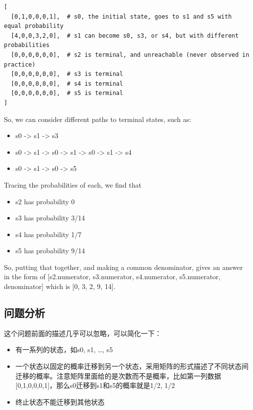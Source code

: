 \documentclass[12pt]{article}
\begin{document}
\begin{verbatim}
[
  [0,1,0,0,0,1],  # s0, the initial state, goes to s1 and s5 with equal probability
  [4,0,0,3,2,0],  # s1 can become s0, s3, or s4, but with different probabilities
  [0,0,0,0,0,0],  # s2 is terminal, and unreachable (never observed in practice)
  [0,0,0,0,0,0],  # s3 is terminal
  [0,0,0,0,0,0],  # s4 is terminal
  [0,0,0,0,0,0],  # s5 is terminal
]
\end{verbatim}

So, we can consider different paths to terminal states, such as:

\begin{itemize}
\tightlist
\item
  s0 -\textgreater{} s1 -\textgreater{} s3
\item
  s0 -\textgreater{} s1 -\textgreater{} s0 -\textgreater{} s1 -\textgreater{} s0 -\textgreater{} s1 -\textgreater{} s4
\item
  s0 -\textgreater{} s1 -\textgreater{} s0 -\textgreater{} s5
\end{itemize}

Tracing the probabilities of each, we find that

\begin{itemize}
\tightlist
\item
  s2 has probability 0
\item
  s3 has probability 3/14
\item
  s4 has probability 1/7
\item
  s5 has probability 9/14
\end{itemize}

So, putting that together, and making a common denominator, gives an answer in the form of {[}s2.numerator, s3.numerator, s4.numerator, s5.numerator, denominator{]} which is {[}0, 3, 2, 9, 14{]}.

\subsection{问题分析}\label{ux95eeux9898ux5206ux6790}

这个问题前面的描述几乎可以忽略，可以简化一下：

\begin{itemize}
\tightlist
\item
  有一系列的状态，如s0, s1, \ldots, s5
\item
  一个状态以固定的概率迁移到另一个状态，采用矩阵的形式描述了不同状态间迁移的概率。注意矩阵里面给的是次数而不是概率，比如第一列数据 {[}0,1,0,0,0,1{]}，那么s0迁移到s1和s5的概率就是1/2, 1/2
\item
  终止状态不能迁移到其他状态
\end{itemize}
\end{document}
